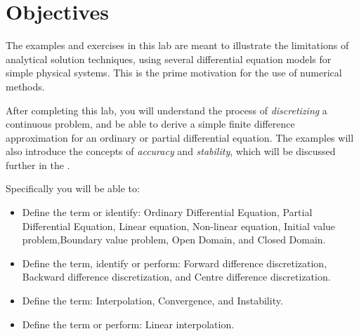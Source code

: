 % 
%
%
%
%
%
%
%
%
%

\section{Objectives}

The examples and exercises in this lab are meant to illustrate the
limitations of analytical solution techniques, using
several differential equation models for simple physical systems.
This is the prime motivation for the use of numerical methods.

After completing this lab, you will understand the process of
\emph{discretizing} a continuous problem, and be able to derive a simple
finite difference approximation for an ordinary or partial
differential equation.
The examples will also introduce the concepts of \emph{accuracy} and
\emph{stability}, which will be discussed further in the 
.

Specifically you will be able  to:
\begin  {itemize}
\item Define the term or identify: Ordinary Differential Equation,
Partial Differential Equation, Linear equation, Non-linear equation,
Initial value problem,Boundary value problem, Open Domain, and Closed
Domain.

\item Define the term, identify or perform: Forward difference discretization,
Backward difference discretization, and Centre difference discretization.

\item Define the term: Interpolation, Convergence, and Instability.

\item Define the term or perform: Linear interpolation.

\end {itemize}

